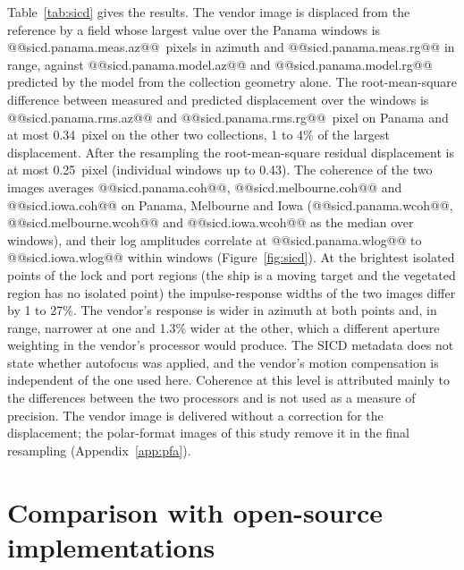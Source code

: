 \documentclass[11pt]{article}
\begin{document}
Table~\ref{tab:sicd} gives the results. The vendor image is displaced from the reference by a field whose largest value over the Panama windows is @@sicd.panama.meas.az@@~pixels in azimuth and @@sicd.panama.meas.rg@@ in range, against @@sicd.panama.model.az@@ and @@sicd.panama.model.rg@@ predicted by the model from the collection geometry alone. The root-mean-square difference between measured and predicted displacement over the windows is @@sicd.panama.rms.az@@ and @@sicd.panama.rms.rg@@~pixel on Panama and at most 0.34~pixel on the other two collections, 1 to 4\% of the largest displacement. After the resampling the root-mean-square residual displacement is at most 0.25~pixel (individual windows up to 0.43). The coherence of the two images averages @@sicd.panama.coh@@, @@sicd.melbourne.coh@@ and @@sicd.iowa.coh@@ on Panama, Melbourne and Iowa (@@sicd.panama.wcoh@@, @@sicd.melbourne.wcoh@@ and @@sicd.iowa.wcoh@@ as the median over windows), and their log amplitudes correlate at @@sicd.panama.wlog@@ to @@sicd.iowa.wlog@@ within windows (Figure~\ref{fig:sicd}). At the brightest isolated points of the lock and port regions (the ship is a moving target and the vegetated region has no isolated point) the impulse-response widths of the two images differ by 1 to 27\%. The vendor's response is wider in azimuth at both points and, in range, narrower at one and 1.3\% wider at the other, which a different aperture weighting in the vendor's processor would produce. The SICD metadata does not state whether autofocus was applied, and the vendor's motion compensation is independent of the one used here. Coherence at this level is attributed mainly to the differences between the two processors and is not used as a measure of precision. The vendor image is delivered without a correction for the displacement; the polar-format images of this study remove it in the final resampling (Appendix~\ref{app:pfa}).

\section{Comparison with open-source implementations}
\label{app:oss}
\end{document}
